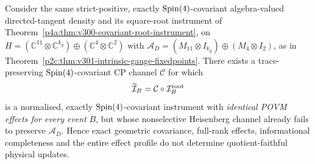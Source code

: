 \documentclass[12pt,a4paper]{article}
\begin{document}
\begin{proposition}
\label{p4a:prop:v301-spin4-same-povm-leak}
Consider the same strict-positive, exactly $\mathrm{Spin}(4)$-covariant
algebra-valued directed-tangent density and its square-root
instrument of
Theorem~\ref{p4a:thm:v300-covariant-root-instrument}, on
$H=(\mathbb C^{11}\otimes\mathbb C^{k_g})\oplus
(\mathbb C^4\otimes\mathbb C^2)$ with
$\mathcal A_D=(M_{11}\otimes I_{k_g})\oplus(M_4\otimes I_2)$,
as in Theorem~\ref{p2c:thm:v301-intrinsic-gauge-fixedpoints}.
There exists a trace-preserving $\mathrm{Spin}(4)$-covariant CP channel
$\mathcal C$ for which
\[
 \widetilde{\mathcal I}_B=\mathcal C\circ\mathcal I_B^{\rm root}
\]
is a normalised, exactly $\mathrm{Spin}(4)$-covariant instrument with
\emph{identical POVM effects for every event} $B$, but whose
nonselective Heisenberg channel already fails to preserve
$\mathcal A_D$. Hence exact geometric covariance, full-rank
effects, informational completeness and the entire effect profile
do not determine quotient-faithful physical updates.
\end{proposition}
\end{document}
